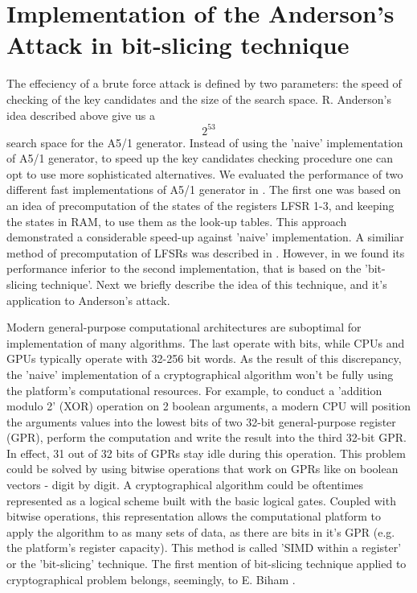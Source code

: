 \documentclass[runningheads,a4paper]{llncs}[2015/06/24]
\begin{document}
\section{Implementation of the Anderson's Attack in bit-slicing
technique}\label{sec:bitslc}

The effeciency of a brute force attack is defined by two parameters: the speed
of checking of the key candidates and the size of the search space. R.
Anderson's idea described above give us a $$2^{53}$$ search space for the A5/1
generator. Instead of using the 'naive' implementation of A5/1 generator, to
speed up the key candidates checking procedure one can opt to use more
sophisticated alternatives. We evaluated the performance of two different fast
implementations of A5/1 generator in \cite{PAVT_2016}. The first one was based
on an idea of precomputation of the states of the registers LFSR 1-3, and
keeping the states in RAM, to use them as the look-up tables. This approach
demonstrated a considerable speed-up against 'naive' implementation. A similiar
method of precomputation of LFSRs was described in \cite{DBLP:conf/fse/BiryukovSW00}. However, in
\cite{PAVT_2016} we found its performance inferior to the second
implementation, that is based on the 'bit-slicing technique'. Next we briefly
describe the idea of this technique, and it's application to Anderson's attack.

Modern general-purpose computational architectures are suboptimal for
implementation of many algorithms. The last operate with bits, while CPUs and
GPUs typically operate with 32-256 bit words. As the result of this
discrepancy, the 'naive' implementation of a cryptographical algorithm won't be
fully using the platform's computational resources. For example, to conduct a
'addition modulo 2' (XOR) operation on 2 boolean arguments, a modern CPU will
position the arguments values into the lowest bits of two 32-bit
general-purpose register (GPR), perform the computation and write the result
into the third 32-bit GPR. In effect, 31 out of 32 bits of GPRs stay idle
during this operation. This problem could be solved by using bitwise operations
that work on GPRs like on boolean vectors - digit by digit. A cryptographical
algorithm could be oftentimes represented as a logical scheme built with the
basic logical gates. Coupled with bitwise operations, this representation
allows the computational platform to apply the algorithm to as many sets of
data, as there are bits in it's GPR (e.g. the platform's register capacity).
This method is called 'SIMD within a register' or the 'bit-slicing' technique.
The first mention of bit-slicing technique applied to cryptographical problem
belongs, seemingly, to E. Biham \cite{BIT_SL}.
\end{document}
